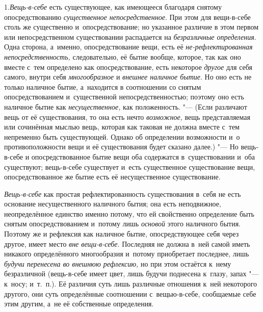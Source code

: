 1.{\em Вещь-в-себе} есть
существующее, как имеющееся благодаря снятому опосредствованию
{\em существенное непосредственное}. При этом для
вещи-в-себе столь же существенно и~опосредствование; но указанное различие
в этом первом или непосредственном существовании распадается на
{\em безразличные определения}. Одна сторона, а~именно,
опосредствование вещи, есть её {\em не-рефлектированная
непосредственность,} следовательно, её бытие вообще, которое, так как оно
вместе с~тем определено как опосредствование, есть некоторое
{\em другое} для себя самого, внутри себя {\em многообразное} и {\em внешнее
наличное бытие}. Но оно есть не только наличное бытие, а~находится в
соотношении со снятым опосредствованием и~существенной непосредственностью;
поэтому оно есть наличное бытие как
{\em несущественное,} как положенность. "--- (Если
различают вещь от её существования, то она есть нечто
{\em возможное,} вещь представляемая или сочинённая
мыслью вещь, которая как таковая не должна вместе с~тем непременно быть
существующей. Однако об определении возможности и~о противоположности вещи
и её существования будет сказано далее.) "--- Но вещь-в-себе и
опосредствованное бытие вещи оба содержатся в~существовании и~оба
существуют; вещь-в-себе существует и~есть существенное существование вещи,
опосредствованное же бытие есть её несущественное существование.

{\em Вещь-в-себе} как простая рефлектированность
существования в~себя не есть основание несущественного наличного бытия; она
есть неподвижное, неопределённое единство именно потому, что ей свойственно
определение быть снятым опосредствованием и~потому лишь
{\em основой} этого наличного бытия. Поэтому же и
рефлексия как наличное бытие, опосредствующее себя через другое, имеет
место {\em вне вещи-в-себе}. Последняя не должна в~ней
самой иметь никакого определённого многообразия и~потому приобретает
последнее, лишь {\em будучи перенесена во внешнюю
рефлексию,} но при этом остаётся к~нему безразличной (вещь-в-себе имеет
цвет, лишь будучи поднесена к~глазу, запах "--- к~носу; и~т.~п.). Её различия
суть лишь различные отношения к~ней некоторого другого, они суть
определённые соотношении с~вещью-в-себе, сообщаемые себе этим другим, а~не
её собственные определения.

